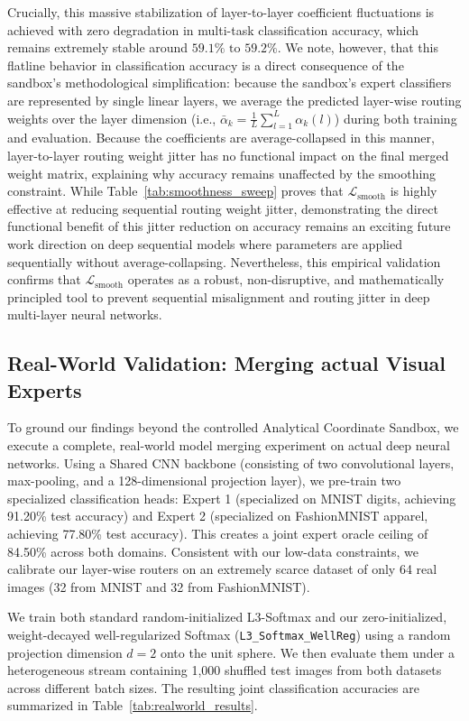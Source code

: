 Crucially, this massive stabilization of layer-to-layer coefficient fluctuations is achieved with zero degradation in multi-task classification accuracy, which remains extremely stable around $59.1\% \text{ to } 59.2\%$. We note, however, that this flatline behavior in classification accuracy is a direct consequence of the sandbox's methodological simplification: because the sandbox's expert classifiers are represented by single linear layers, we average the predicted layer-wise routing weights over the layer dimension (i.e., $\bar{\alpha}_k = \frac{1}{L} \sum_{l=1}^L \alpha_k(l)$) during both training and evaluation. Because the coefficients are average-collapsed in this manner, layer-to-layer routing weight jitter has no functional impact on the final merged weight matrix, explaining why accuracy remains unaffected by the smoothing constraint. While Table~\ref{tab:smoothness_sweep} proves that $\mathcal{L}_{\text{smooth}}$ is highly effective at reducing sequential routing weight jitter, demonstrating the direct functional benefit of this jitter reduction on accuracy remains an exciting future work direction on deep sequential models where parameters are applied sequentially without average-collapsing. Nevertheless, this empirical validation confirms that $\mathcal{L}_{\text{smooth}}$ operates as a robust, non-disruptive, and mathematically principled tool to prevent sequential misalignment and routing jitter in deep multi-layer neural networks.

\subsection{Real-World Validation: Merging actual Visual Experts}
\label{subsec:realworld_experiments}
To ground our findings beyond the controlled Analytical Coordinate Sandbox, we execute a complete, real-world model merging experiment on actual deep neural networks. Using a Shared CNN backbone (consisting of two convolutional layers, max-pooling, and a 128-dimensional projection layer), we pre-train two specialized classification heads: Expert 1 (specialized on MNIST digits, achieving 91.20\% test accuracy) and Expert 2 (specialized on FashionMNIST apparel, achieving 77.80\% test accuracy). This creates a joint expert oracle ceiling of 84.50\% across both domains. Consistent with our low-data constraints, we calibrate our layer-wise routers on an extremely scarce dataset of only 64 real images (32 from MNIST and 32 from FashionMNIST).

We train both standard random-initialized L3-Softmax and our zero-initialized, weight-decayed well-regularized Softmax (\texttt{L3\_Softmax\_WellReg}) using a random projection dimension $d=2$ onto the unit sphere. We then evaluate them under a heterogeneous stream containing 1,000 shuffled test images from both datasets across different batch sizes. The resulting joint classification accuracies are summarized in Table~\ref{tab:realworld_results}.

